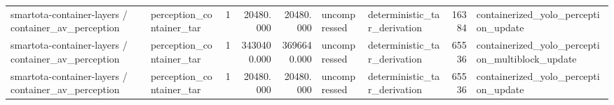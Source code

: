 \begin{table}
{\begin{tabular}{llrrrllrl}
smartota-container-layers / container_av_perception & perception_container_tar & 1 & 20480.000 & 20480.000 & uncompressed & deterministic_tar_derivation & 16384 & containerized_yolo_perception_update \\
smartota-container-layers / container_av_perception & perception_container_tar & 1 & 3430400.000 & 3696640.000 & uncompressed & deterministic_tar_derivation & 65536 & containerized_yolo_perception_multiblock_update \\
smartota-container-layers / container_av_perception & perception_container_tar & 1 & 20480.000 & 20480.000 & uncompressed & deterministic_tar_derivation & 65536 & containerized_yolo_perception_update \\
\bottomrule
\end{tabular}
}
\end{table}
